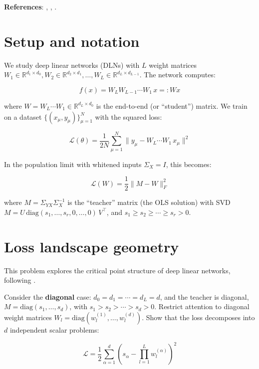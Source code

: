 \documentclass[11pt]{article}
\begin{document}
\textbf{References}: \cite{saxe2014}, \cite{achour2024}, \cite{tu2024}.

\section{Setup and notation}

We study deep linear networks (DLNs) with \(L\) weight matrices
\(W_1 \in \mathbb{R}^{d_1 \times d_0}, W_2 \in \mathbb{R}^{d_2 \times d_1}, \ldots, W_L \in \mathbb{R}^{d_L \times d_{L-1}}\).
The network computes:

\[f(x) = W_L W_{L-1} \cdots W_1 \, x =: W x\]

where \(W = W_L \cdots W_1 \in \mathbb{R}^{d_L \times d_0}\) is the
end-to-end (or ``student'') matrix. We train on a dataset
\(\{(x_\mu, y_\mu)\}_{\mu=1}^N\) with the squared loss:

\[\mathcal{L}(\theta) = \frac{1}{2N} \sum_{\mu=1}^{N} \|y_\mu - W_L \cdots W_1 \, x_\mu\|^2\]

In the population limit with whitened inputs \(\Sigma_X = I\), this
becomes:

\[\mathcal{L}(W) = \frac{1}{2}\|M - W\|_F^2\]

where \(M = \Sigma_{YX} \Sigma_X^{-1}\) is the ``teacher'' matrix (the
OLS solution) with SVD
\(M = U \,\text{diag}(s_1, \ldots, s_r, 0, \ldots, 0)\, V^\top\), and
\(s_1 \geq s_2 \geq \cdots \geq s_r > 0\).

\section{Loss landscape geometry}
\label{sec:td-geometry}

This problem explores the critical point structure of deep linear
networks, following \cite{achour2024}.

\begin{exercise}
\label{ex:td-1a}
Consider the \textbf{diagonal} case:
\(d_0 = d_1 = \cdots = d_L = d\), and the teacher is diagonal,
\(M = \text{diag}(s_1, \ldots, s_d)\), with
\(s_1 > s_2 > \cdots > s_d > 0\). Restrict attention to diagonal weight
matrices \(W_l = \text{diag}(w_l^{(1)}, \ldots, w_l^{(d)})\). Show that
the loss decomposes into \(d\) independent scalar problems:

\[\mathcal{L} = \frac{1}{2}\sum_{\alpha=1}^d \left(s_\alpha - \prod_{l=1}^L w_l^{(\alpha)}\right)^2\]
\end{exercise}
\end{document}
